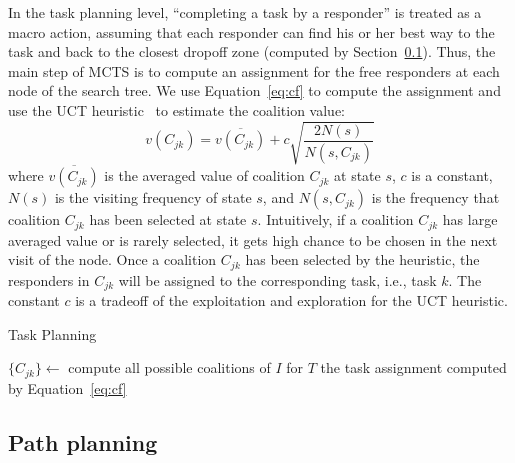 In the task planning level, ``completing a task by a responder'' is
treated as a macro action, assuming that each responder can find
his or her best way to the task and back to the closest dropoff
zone (computed by Section~\ref{sec:pathplanning}). Thus, the main
step of MCTS is to compute an assignment for the free responders at
each node of the search tree. We use Equation~\ref{eq:cf} to
compute the assignment and use the UCT heuristic~\cite{?} to
estimate the coalition value:
\begin{equation}
  v(C_{jk}) = \overline{v(C_{jk})} + c\sqrt{\frac{2N(s)}{N(s, C_{jk})}}
\end{equation}
where $\overline{v(C_{jk})}$ is the averaged value of coalition
$C_{jk}$ at state $s$, $c$ is a constant, $N(s)$ is the visiting
frequency of state $s$, and $N(s, C_{jk})$ is the frequency that
coalition $C_{jk}$ has been selected at state $s$. Intuitively, if
a coalition $C_{jk}$ has large averaged value or is rarely
selected, it gets high chance to be chosen in the next visit of the
node. Once a coalition $C_{jk}$ has been selected by the heuristic,
the responders in $C_{jk}$ will be assigned to the corresponding
task, i.e., task $k$. The constant $c$ is a tradeoff of the
exploitation and exploration for the UCT heuristic.

\begin{algorithm}[t]
  \caption{Task Planning}
  $\{ C_{jk} \} \gets$ compute all possible coalitions of $I$ for
  $T$ \;
  \Return the task assignment computed by Equation~\ref{eq:cf}
  \label{alg:tp}
\end{algorithm}


\subsection{Path planning}
\label{sec:pathplanning}

